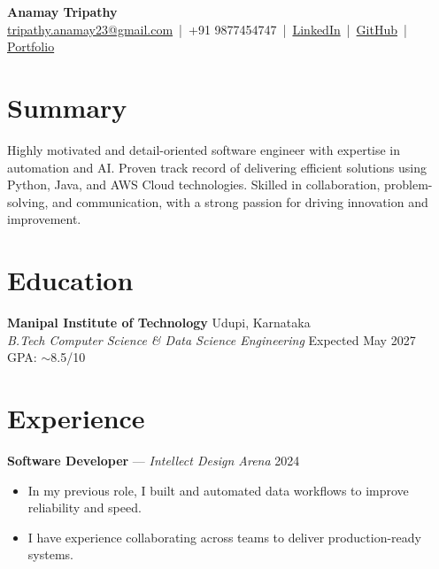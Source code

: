 \documentclass[letterpaper,10pt]{article}
\begin{document}
\begin{center}
    {\LARGE \textbf{Anamay Tripathy}} \\[2pt]
    \small
    \href{mailto:tripathy.anamay23@gmail.com}{tripathy.anamay23@gmail.com} \,|\,
    +91 9877454747 \,|\,
    \href{https://www.linkedin.com/in/anamay-tripathy-b53829296/}{LinkedIn} \,|\,
    \href{https://github.com/Flamechargerr}{GitHub} \,|\,
    \href{https://anamay.vercel.app/}{Portfolio}
\end{center}

\section{Summary}
Highly motivated and detail-oriented software engineer with expertise in automation and AI. Proven track record of delivering efficient solutions using Python, Java, and AWS Cloud technologies. Skilled in collaboration, problem-solving, and communication, with a strong passion for driving innovation and improvement.

\section{Education}
\textbf{Manipal Institute of Technology} \hfill Udupi, Karnataka \\
\textit{B.Tech Computer Science \& Data Science Engineering} \hfill Expected May 2027 \\
GPA: $\sim$8.5/10

\section{Experience}

\textbf{Software Developer} — \textit{Intellect Design Arena} \hfill 2024
\begin{itemize}
\item In my previous role, I built and automated data workflows to improve reliability and speed.
\item I have experience collaborating across teams to deliver production-ready systems.
\end{itemize}
\end{document}

